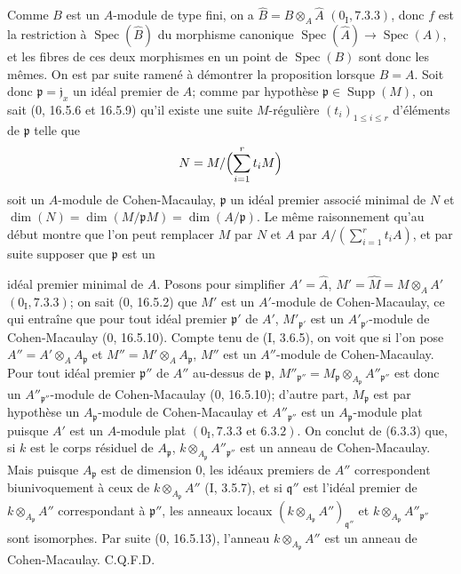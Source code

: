 \documentclass[10pt,oneside]{book}
\newcommand{\oldpage}[2][]{%
  \setcounter{footnote}{0}%
  \marginpar{\scriptsize\textbf{#1}~|~#2}\ignorespaces}
\begin{document}
Comme $B$ est un $A$-module de type fini, on a
$\widehat B=B\otimes_A\widehat A$ $(0_{\mathrm I}, 7.3.3)$, donc $f$ est la
restriction à $\operatorname{Spec}(\widehat B)$ du morphisme canonique
$\operatorname{Spec}(\widehat A)\to\operatorname{Spec}(A)$, et les fibres de
ces deux morphismes en un point de $\operatorname{Spec}(B)$ sont donc les
mêmes. On est par suite ramené à démontrer la proposition lorsque $B=A$.
Soit donc $\mathfrak p=\mathfrak j_x$ un idéal premier de $A$; comme par
hypothèse $\mathfrak p\in\operatorname{Supp}(M)$, on sait (0, 16.5.6 et
16.5.9) qu'il existe une suite $M$-régulière $(t_i)_{1\leq i\leq r}$
d'éléments de $\mathfrak p$ telle que
\[
N=M/\Bigl(\sum_{i=1}^{r}t_iM\Bigr)
\]
soit un $A$-module de Cohen-Macaulay, $\mathfrak p$ un idéal premier associé
minimal de $N$ et
$\dim(N)=\dim(M/\mathfrak pM)=\dim(A/\mathfrak p)$. Le même raisonnement
qu'au début montre que l'on peut remplacer $M$ par $N$ et $A$ par
$A/(\sum_{i=1}^{r}t_iA)$, et par suite supposer que $\mathfrak p$ est un

\oldpage[IV-2]{141}

idéal premier minimal de $A$. Posons pour simplifier
$A'=\widehat A$, $M'=\widehat M=M\otimes_AA'$ $(0_{\mathrm I}, 7.3.3)$; on
sait (0, 16.5.2) que $M'$ est un $A'$-module de Cohen-Macaulay, ce qui entraîne
que pour tout idéal premier $\mathfrak p'$ de $A'$,
$M'_{\mathfrak p'}$ est un $A'_{\mathfrak p'}$-module de Cohen-Macaulay
(0, 16.5.10). Compte tenu de (I, 3.6.5), on voit que si l'on pose
$A''=A'\otimes_AA_{\mathfrak p}$ et
$M''=M'\otimes_AA_{\mathfrak p}$, $M''$ est un $A''$-module de
Cohen-Macaulay. Pour tout idéal premier $\mathfrak p''$ de $A''$ au-dessus
de $\mathfrak p$,
$M''_{\mathfrak p''}=M_{\mathfrak p}\otimes_{A_{\mathfrak p}}
A''_{\mathfrak p''}$ est donc un $A''_{\mathfrak p''}$-module de
Cohen-Macaulay (0, 16.5.10); d'autre part, $M_{\mathfrak p}$ est par hypothèse
un $A_{\mathfrak p}$-module de Cohen-Macaulay et
$A''_{\mathfrak p''}$ est un $A_{\mathfrak p}$-module plat puisque $A'$ est
un $A$-module plat $(0_{\mathrm I}, 7.3.3\text{ et }6.3.2)$. On conclut de (6.3.3)
que, si $k$ est le corps résiduel de $A_{\mathfrak p}$,
$k\otimes_{A_{\mathfrak p}}A''_{\mathfrak p''}$ est un anneau de
Cohen-Macaulay. Mais puisque $A_{\mathfrak p}$ est de dimension $0$, les
idéaux premiers de $A''$ correspondent biunivoquement à ceux de
$k\otimes_{A_{\mathfrak p}}A''$ (I, 3.5.7), et si $\mathfrak q''$ est l'idéal
premier de $k\otimes_{A_{\mathfrak p}}A''$ correspondant à
$\mathfrak p''$, les anneaux locaux
$(k\otimes_{A_{\mathfrak p}}A'')_{\mathfrak q''}$ et
$k\otimes_{A_{\mathfrak p}}A''_{\mathfrak p''}$ sont isomorphes. Par suite
(0, 16.5.13), l'anneau $k\otimes_{A_{\mathfrak p}}A''$ est un anneau de
Cohen-Macaulay. C.Q.F.D.
\end{document}
